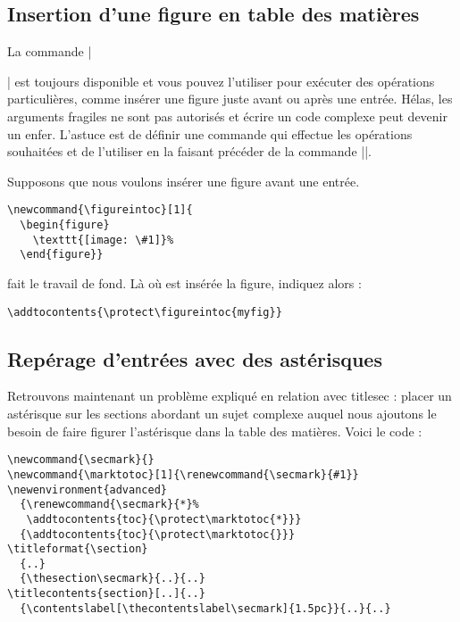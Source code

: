 \documentclass[a4paper]{ltxguide}
\begin{document}
\subsection{Insertion d'une figure en table des matières}

La commande |\addtocontents| est toujours disponible et vous pouvez l'utiliser
pour exécuter des opérations particulières, comme insérer une figure juste
avant ou après une entrée. Hélas, les arguments fragiles ne sont pas autorisés
et écrire un code complexe peut devenir un enfer. L'astuce est de définir 
une commande qui effectue les opérations souhaitées et de l'utiliser en la
faisant précéder de la commande |\protect|.

Supposons que nous voulons insérer une figure avant une entrée.
\begin{verbatim}
\newcommand{\figureintoc}[1]{
  \begin{figure}
    \texttt{[image: \#1]}%
  \end{figure}}
\end{verbatim}
fait le travail de fond. Là où est insérée la figure, indiquez alors :
\begin{verbatim}
\addtocontents{\protect\figureintoc{myfig}}
\end{verbatim}


\subsection{Repérage d'entrées avec des astérisques}

Retrouvons maintenant un problème expliqué en relation avec \textsf{titlesec} :
placer un astérisque sur les sections abordant un \og sujet complexe \fg{}
auquel nous ajoutons le besoin de faire figurer l'astérisque dans la table des
matières. Voici le code :
\begin{verbatim}
\newcommand{\secmark}{}
\newcommand{\marktotoc}[1]{\renewcommand{\secmark}{#1}}
\newenvironment{advanced}
  {\renewcommand{\secmark}{*}%
   \addtocontents{toc}{\protect\marktotoc{*}}}
  {\addtocontents{toc}{\protect\marktotoc{}}}
\titleformat{\section}
  {..}
  {\thesection\secmark}{..}{..}
\titlecontents{section}[..]{..}
  {\contentslabel[\thecontentslabel\secmark]{1.5pc}}{..}{..}
\end{verbatim}
\end{document}
